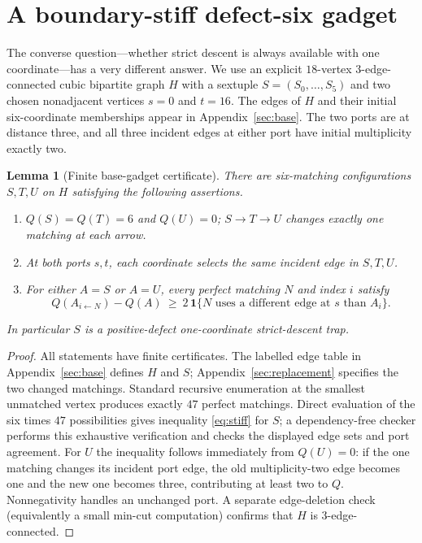 \documentclass[11pt]{article}
\newtheorem{lemma}[theorem]{Lemma}
\begin{document}
\section{A boundary-stiff defect-six gadget}
The converse question---whether strict descent is always available with one coordinate---has a very different answer. We use an explicit $18$-vertex $3$-edge-connected cubic bipartite graph $H$ with a sextuple $S=(S_0,\ldots,S_5)$ and two chosen nonadjacent vertices $s=0$ and $t=16$. The edges of $H$ and their initial six-coordinate memberships appear in Appendix~\ref{sec:base}. The two ports are at distance three, and all three incident edges at either port have initial multiplicity exactly two.

\begin{lemma}[Finite base-gadget certificate]\label{lem:stiff}
There are six-matching configurations $S,T,U$ on $H$ satisfying the following assertions.
\begin{enumerate}
\item $Q(S)=Q(T)=6$ and $Q(U)=0$; $S\to T\to U$ changes exactly one matching at each arrow.
\item At both ports $s,t$, each coordinate selects the same incident edge in $S,T,U$.
\item For either $A=S$ or $A=U$, every perfect matching $N$ and index $i$ satisfy
\begin{equation}\label{eq:stiff}
Q(A_{i\leftarrow N})-Q(A)\ \ge\ 2\,\mathbf1\{N\text{ uses a different edge at }s\text{ than }A_i\}.
\end{equation}
\end{enumerate}
In particular $S$ is a positive-defect one-coordinate strict-descent trap.
\end{lemma}
\begin{proof}
All statements have finite certificates. The labelled edge table in Appendix~\ref{sec:base} defines $H$ and $S$; Appendix~\ref{sec:replacement} specifies the two changed matchings. Standard recursive enumeration at the smallest unmatched vertex produces exactly $47$ perfect matchings. Direct evaluation of the six times $47$ possibilities gives inequality \eqref{eq:stiff} for $S$; a dependency-free checker performs this exhaustive verification and checks the displayed edge sets and port agreement. For $U$ the inequality follows immediately from $Q(U)=0$: if the one matching changes its incident port edge, the old multiplicity-two edge becomes one and the new one becomes three, contributing at least two to $Q$. Nonnegativity handles an unchanged port. A separate edge-deletion check (equivalently a small min-cut computation) confirms that $H$ is $3$-edge-connected.
\end{proof}
\end{document}
